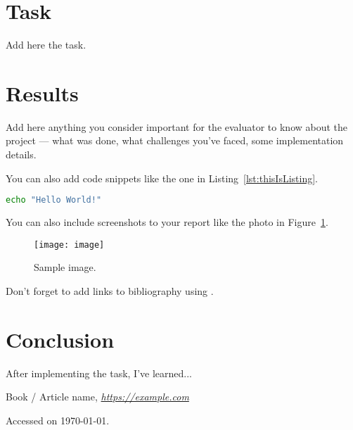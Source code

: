\documentclass[12pt,a4paper]{article}
\begin{document}

\section{Task}
Add here the task.

\section{Results}

Add here anything you consider important for the evaluator to know about the project --- what was done, what challenges you've faced, some implementation details.

You can also add code snippets like the one in Listing~\ref{lst:thisIsListing}.

\begin{lstlisting}[language=Bash, caption={Sample listing.}, label=lst:thisIsListing]
echo "Hello World!"
\end{lstlisting}


You can also include screenshots to your report like the photo in Figure~\ref{fig:thisIsImage}.

\begin{figure}[!h]
\centering
\texttt{[image: image]}
\caption{Sample image.}
\label{fig:thisIsImage}
\end{figure}

Don't forget to add links to bibliography using \texttt{\cite{thisIsBibliographyReference}}.

\section{Conclusion}

After implementing the task, I've learned...

\begin{thebibliography}{9}
    Book / Article name,
    \textit{\url{https://example.com}}

    Accessed on \today .
\end{thebibliography}
\end{document}
